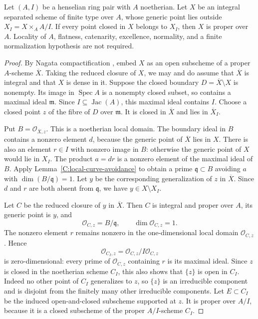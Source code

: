 \begin{theorem}\label{C:henselian-horizontal-proper}
Let $(A,I)$ be a henselian ring pair with $A$ noetherian.
Let $X$ be an integral separated scheme of finite type over $A$,
whose generic point lies outside $X_I=X\times_A A/I$.
If every point closed in $X$ belongs to $X_I$, then $X$ is proper
over $A$. Locality of $A$, flatness, catenarity, excellence,
normality, and a finite normalization hypothesis are not required.
\end{theorem}
\begin{proof}
By Nagata compactification \cite[Theorem~38.33.8, Tag~0F41]{BStacks},
embed $X$ as an open subscheme of a proper $A$-scheme
$\overline X$. Taking the reduced closure of $X$, we may and do
assume that $\overline X$ is integral and that $X$ is dense in it.
Suppose the closed boundary $D=\overline X\setminus X$ is nonempty.
Its image in $\operatorname{Spec}A$ is a nonempty closed subset,
so contains a maximal ideal $\mathfrak m$. Since
$I\subseteq\operatorname{Jac}(A)$, this maximal ideal contains
$I$. Choose a closed point $z$ of the fibre of $D$ over
$\mathfrak m$. It is closed in $\overline X$ and lies in
$\overline X_I$.

Put $B=\mathcal O_{\overline X,z}$. This is a noetherian local
domain. The boundary ideal in $B$ contains a nonzero element $d$,
because the generic point of $\overline X$ lies in $X$. There is
also an element $r\in I$ with nonzero image in $B$:
otherwise the generic point of $X$ would lie in $X_I$.
The product $a=dr$ is a nonzero element
of the maximal ideal of $B$. Apply
Lemma~\ref{C:local-curve-avoidance} to obtain a prime
$\mathfrak q\subset B$ avoiding $a$ with $\dim(B/\mathfrak q)=1$.
Let $y$ be the corresponding generalization of $z$ in
$\overline X$. Since $d$ and $r$ are both absent from
$\mathfrak q$, we have $y\in X\setminus X_I$.

Let $C$ be the reduced closure of $y$ in $\overline X$.
Then $C$ is integral and proper over $A$, its generic point is $y$,
and
\[
 \mathcal O_{C,z}=B/\mathfrak q,
 \qquad \dim\mathcal O_{C,z}=1.
\]
The nonzero element $r$ remains nonzero in the one-dimensional
local domain $\mathcal O_{C,z}$. Hence
\[
 \mathcal O_{C_I,z}
 =\mathcal O_{C,z}/I\mathcal O_{C,z}
\]
is zero-dimensional: every prime of $\mathcal O_{C,z}$ containing
$r$ is its maximal ideal. Since $z$ is closed in the noetherian
scheme $C_I$, this also shows that $\{z\}$ is open in $C_I$.
Indeed no other point of $C_I$ generalizes to $z$, so $\{z\}$
is an irreducible component and is disjoint from the finitely
many other irreducible components. Let $E\subset C_I$ be the
induced open-and-closed subscheme supported at $z$. It is proper
over $A/I$, because it is a closed subscheme of the proper
$A/I$-scheme $C_I$.


\end{proof}
